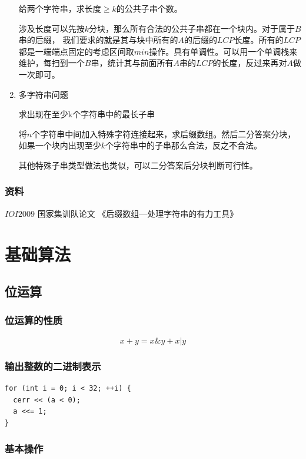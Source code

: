 \documentclass[11pt]{article}
\begin{document}
\begin{enumerate}
给两个字符串，求长度\(\geq k\)的公共子串个数。

涉及长度可以先按\(k\)分块，那么所有合法的公共子串都在一个块内。对于属于\(B\)串的后缀， 我们要求的就是其与块中所有的\(A\)的后缀的\(LCP\)长度。所有的\(LCP\)都是一端端点固定的考虑区间取\(min\)操作。具有单调性。可以用一个单调栈来维护，每扫到一个\(B\)串，统计其与前面所有\(A\)串的\(LCP\)的长度，反过来再对\(A\)做一次即可。

\item 多字符串问题
\label{sec-3-3-3-10}

求出现在至少k个字符串中的最长子串

将\(n\)个字符串中间加入特殊字符连接起来，求后缀数组。然后二分答案分块，如果一个块内出现至少\(k\)个字符串中的子串那么合法，反之不合法。

其他特殊子串类型做法也类似，可以二分答案后分块判断可行性。
\end{enumerate}

\subsubsection{资料}
\label{sec-3-3-4}

\(IOI2009\) 国家集训队论文 《后缀数组—处理字符串的有力工具》
\section{基础算法}
\label{sec-4}
\subsection{位运算}
\label{sec-4-1}
\subsubsection{位运算的性质}
\label{sec-4-1-1}

$$
x+y=x \& y + x | y
$$ 

\subsubsection{输出整数的二进制表示}
\label{sec-4-1-2}

\begin{verbatim}
for (int i = 0; i < 32; ++i) {
  cerr << (a < 0);
  a <<= 1;
}
\end{verbatim}

\subsubsection{基本操作}
\label{sec-4-1-3}
\end{document}
